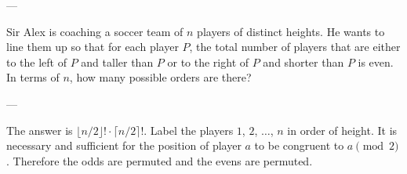 
---

Sir Alex is coaching a soccer team of $n$ players of distinct heights. He wants to line them up so that for each player $P$, the total number of players that are either to the left of $P$ and taller than $P$ or to the right of $P$ and shorter than $P$ is even. In terms of $n$, how many possible orders are there?

---

The answer is $\lfloor n/2\rfloor!\cdot\lceil n/2\rceil!$. Label the players $1$, $2$, $\ldots$, $n$ in order of height. It is necessary and sufficient for the position of player $a$ to be congruent to $a\pmod2$. Therefore the odds are permuted and the evens are permuted.


